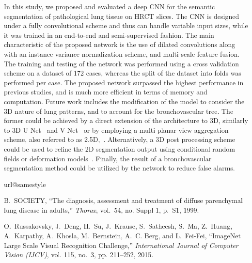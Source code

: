 \documentclass[journal]{IEEEtran}
\begin{document}
In this study, we proposed and evaluated a deep CNN for the semantic segmentation of pathological lung tissue on HRCT slices. The CNN is designed under a fully convolutional scheme and thus can handle variable input sizes, while it was trained in an end-to-end and semi-supervised fashion. The main characteristic of the proposed network is the use of dilated convolutions along with an instance variance normalization scheme, and multi-scale feature fusion. The training and testing of the network was performed using a cross validation scheme on a dataset of 172 cases, whereas the split of the dataset into folds was performed per case. The proposed network surpassed the highest performance in previous studies, and is much more efficient in terms of memory and computation. Future work includes the modification of the model to consider the 3D nature of lung patterns, and to account for the bronchovascular tree. The former could be achieved by a direct extension of the architecture to 3D, similarly to 3D U-Net~\cite{cciccek20163d} and V-Net~\cite{milletari2016v} or by employing a multi-planar view aggregation scheme, also referred to as 2.5D,~\cite{roth2016improving}. Alternatively, a 3D post processing scheme could be used to refine the 2D segmentation output using conditional random fields or deformation models~\cite{liu2018deep, christ2016automatic, kamnitsas2017efficient}. Finally, the result of a bronchovascular segmentation method could be utilized by the network to reduce false alarms.

\providecommand{\url}[1]{#1}
\csname url@samestyle\endcsname
\providecommand{\newblock}{\relax}
\providecommand{\bibinfo}[2]{#2}
\providecommand{\BIBentrySTDinterwordspacing}{\spaceskip=0pt\relax}
\providecommand{\BIBentryALTinterwordstretchfactor}{4}
\providecommand{\BIBentryALTinterwordspacing}{\spaceskip=\fontdimen2\font plus
\BIBentryALTinterwordstretchfactor\fontdimen3\font minus
  \fontdimen4\font\relax}
\providecommand{\BIBforeignlanguage}[2]{{%
\expandafter\ifx\csname l@#1\endcsname\relax
\typeout{** WARNING: IEEEtran.bst: No hyphenation pattern has been}%
\typeout{** loaded for the language `#1'. Using the pattern for}%
\typeout{** the default language instead.}%
\else
\language=\csname l@#1\endcsname
\fi
#2}}
\providecommand{\BIBdecl}{\relax}
\BIBdecl

B.~SOCIETY, ``The diagnosis, assessment and treatment of diffuse parenchymal
  lung disease in adults,'' \emph{Thorax}, vol.~54, no. Suppl 1, p.~S1, 1999.

O.~Russakovsky, J.~Deng, H.~Su, J.~Krause, S.~Satheesh, S.~Ma, Z.~Huang,
  A.~Karpathy, A.~Khosla, M.~Bernstein, A.~C. Berg, and L.~Fei-Fei, ``{ImageNet
  Large Scale Visual Recognition Challenge},'' \emph{International Journal of
  Computer Vision (IJCV)}, vol. 115, no.~3, pp. 211--252, 2015.
\end{document}
